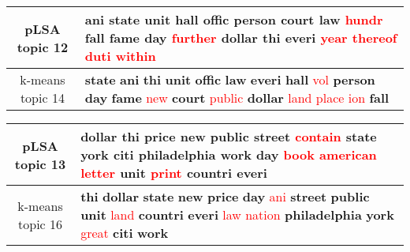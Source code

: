 \begin{center}\begin{tabularx}{\textwidth} {
  | c | >{\raggedright\arraybackslash}X | } \hline 
pLSA topic 12 & \textbf{ani} \textbf{state} \textbf{unit} \textbf{hall} \textbf{offic} \textbf{person} \textbf{court} \textbf{law} \textcolor{red}{hundr} \textbf{fall} \textbf{fame} \textbf{day} \textcolor{red}{further} \textbf{dollar} \textbf{thi} \textbf{everi} \textcolor{red}{year} \textcolor{red}{thereof} \textcolor{red}{duti} \textcolor{red}{within} \\ \hline 
k-means topic 14 & \textbf{state} \textbf{ani} \textbf{thi} \textbf{unit} \textbf{offic} \textbf{law} \textbf{everi} \textbf{hall} \textcolor{red}{vol} \textbf{person} \textbf{day} \textbf{fame} \textcolor{red}{new} \textbf{court} \textcolor{red}{public} \textbf{dollar} \textcolor{red}{land} \textcolor{red}{place} \textcolor{red}{ion} \textbf{fall} \\ \hline 
\end{tabularx}

\end{center}

\begin{center}\begin{tabularx}{\textwidth} {
  | c | >{\raggedright\arraybackslash}X | } \hline 
pLSA topic 13 & \textbf{dollar} \textbf{thi} \textbf{price} \textbf{new} \textbf{public} \textbf{street} \textcolor{red}{contain} \textbf{state} \textbf{york} \textbf{citi} \textbf{philadelphia} \textbf{work} \textbf{day} \textcolor{red}{book} \textcolor{red}{american} \textcolor{red}{letter} \textbf{unit} \textcolor{red}{print} \textbf{countri} \textbf{everi} \\ \hline 
k-means topic 16 & \textbf{thi} \textbf{dollar} \textbf{state} \textbf{new} \textbf{price} \textbf{day} \textcolor{red}{ani} \textbf{street} \textbf{public} \textbf{unit} \textcolor{red}{land} \textbf{countri} \textbf{everi} \textcolor{red}{law} \textcolor{red}{nation} \textbf{philadelphia} \textbf{york} \textcolor{red}{great} \textbf{citi} \textbf{work} \\ \hline 
\end{tabularx}

\end{center}

